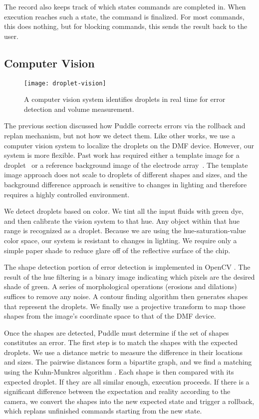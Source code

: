 \documentclass{jpaper}
\begin{document}
The record also keeps track of which states commands are completed in.
When execution reaches such a state, the command is finalized.
For most commands, this does nothing, but for blocking commands, this sends the result back to the user.

\subsection{Computer Vision}
\label{sec:vision}

\begin{figure}
  \centering
  \texttt{[image: droplet-vision]}
  \caption{
    A computer vision system identifies droplets in real time for error detection and volume measurement.
  }
  \label{fig:tracking}
\end{figure}

The previous section discussed how Puddle corrects errors via the rollback and replan mechanism, but not how we detect them.
Like other works, we use a computer vision system to localize the droplets on the DMF device.
However, our system is more flexible.
Past work has required either a template image for a droplet~\cite{luo2013error} or a reference background image of the electrode array~\cite{shin2010vision, vo2017image-dmf}.
The template image approach does not scale to droplets of different shapes and sizes, and the background difference approach is sensitive to changes in lighting and therefore requires a highly controlled environment.

We detect droplets based on color.
We tint all the input fluids with green dye, and then calibrate the vision system to that hue.
Any object within that hue range is recognized as a droplet.
Because we are using the hue-saturation-value color space, our system is resistant to changes in lighting.
We require only a simple paper shade to reduce glare off of the reflective surface of the chip.

The shape detection portion of error detection is implemented in OpenCV \cite{opencv}.
The result of the hue filtering is a binary image indicating which pixels are the desired shade of green.
A series of morphological operations (erosions and dilations) suffices to remove any noise.
A contour finding algorithm \cite{findcontours} then generates shapes that represent the droplets.
We finally use a projective transform to map those shapes from the image's coordinate space to that of the DMF device.

Once the shapes are detected, Puddle must determine if the set of shapes constitutes an error.
The first step is to match the shapes with the expected droplets.
We use a distance metric to measure the difference in their locations and sizes.
The pairwise distances form a bipartite graph, and we find a matching using the Kuhn-Munkres algorithm \cite{munkres}.
Each shape is then compared with its expected droplet.
If they are all similar enough, execution proceeds.
If there is a significant difference between the expectation and reality according to the camera, we convert the shapes into the new expected state and trigger a rollback, which replans unfinished commands starting from the new state.
\end{document}
